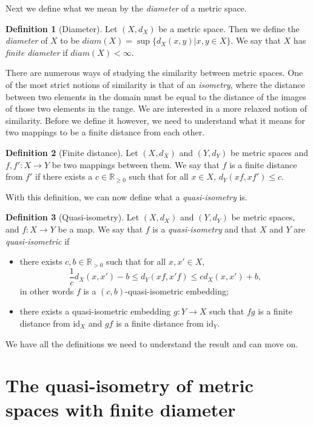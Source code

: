 \documentclass[12pt]{article}
\theoremstyle{definition}
\newtheorem*{definition}{Definition}
\theoremstyle{theorem}
\theoremstyle{remark}
\begin{document}
Next we define what we mean by the \textit{diameter} of a metric space. 

\begin{definition}[Diameter]
  Let $(X,d_X)$ be a metric space. Then we define the \textit{diameter} of $X$ to be $diam(X)=\sup\{d_X(x,y)|x,y\in X\}$. We say that $X$ has \textit{finite diameter} if $diam(X)<\infty$.
\end{definition}

There are numerous ways of studying the similarity between metric spaces. One of the most strict notions of similarity is that of an \textit{isometry}, where the distance between two elements in the domain must be equal to the distance of the images of those two elements in the range. We are interested in a more relaxed notion of similarity. Before we define it however, we need to understand what it means for two mappings to be a finite distance from each other.

\begin{definition}[Finite distance]
  Let $(X,d_X)$ and $(Y,d_Y)$ be metric spaces and $f,f':X\to Y$ be two mappings between them. We say that $f$ is a finite distance from $f'$ if there exists a $c\in \mathbb{R}_{\geq 0}$ such that for all $x\in X$, $d_Y(xf,xf')\leq c$. 
\end{definition}

With this definition, we can now define what a \textit{quasi-isometry} is.

\begin{definition}[Quasi-isometry]
  Let $(X,d_X)$ and $(Y,d_Y)$ be metric spaces, and $f:X\to Y$ be a map. We say that $f$ is a \textit{quasi-isometry} and that $X$ and $Y$ are \textit{quasi-isometric} if
  \begin{itemize}
  \item there exists $c,b\in \mathbb{R}_{>0}$ such that for all $x,x'\in X$, $$\frac{1}{c}d_X(x,x')-b\leq d_Y(xf,x'f)\leq cd_X(x,x')+b,$$ in other words $f$ is a $(c,b)$-quasi-isometric embedding;
    \item there exists a quasi-isometric embedding $g:Y\to X$ such that $fg$ is a finite distance from $\textrm{id}_X$ and $gf$ is a finite distance from $\textrm{id}_Y$.
  \end{itemize}
\end{definition}

We have all the definitions we need to understand the result and can move on.


\section{The quasi-isometry of metric spaces with finite diameter}
\end{document}
